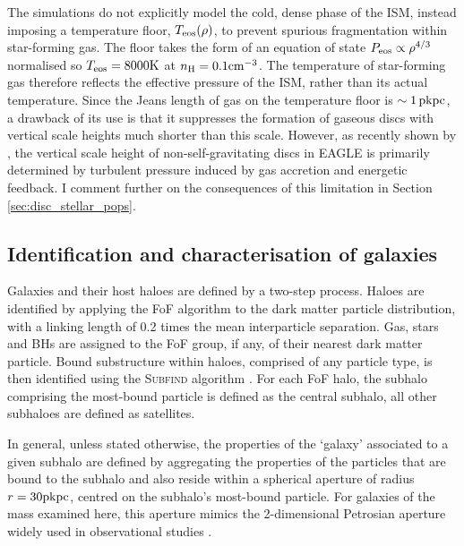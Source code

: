 The simulations do not explicitly model the cold, dense phase of the ISM, instead imposing a temperature floor, $T_{\rm eos}(\rho)$, to prevent spurious fragmentation within star-forming gas. The floor takes the form of an equation of state $P_{\rm eos} \propto \rho^{4/3}$ normalised so $T_{\rm eos} = 8000 {\rm K}$ at $n_{\rm H} = 0.1 {\rm cm}^{-3}$. The temperature of star-forming gas therefore reflects the effective pressure of the ISM, rather than its actual temperature. Since the Jeans length of gas on the temperature floor is $\sim 1\,{\rm pkpc}$, a drawback of its use is that it suppresses the formation of gaseous discs with vertical scale heights much shorter than this scale. However, as recently shown by \citet{2018MNRAS.473.1019B}, the vertical scale height of non-self-gravitating discs in EAGLE is primarily determined by turbulent pressure induced by gas accretion and energetic feedback. I comment further on the consequences of this limitation in Section \ref{sec:disc_stellar_pops}. 

\subsection{Identification and characterisation of galaxies}
\label{sec:finding_galaxies}
Galaxies and their host haloes are defined by a two-step process. Haloes are identified by applying the FoF algorithm to the dark matter particle distribution, with a linking length of 0.2 times the mean interparticle separation. Gas, stars and BHs are assigned to the FoF group, if any, of their nearest dark matter particle. Bound substructure within haloes, comprised of any particle type, is then identified using the \textsc{Subfind} algorithm \citep{2001MNRAS.328..726S,2009MNRAS.399..497D}. For each FoF halo, the subhalo comprising the most-bound particle is defined as the central subhalo, all other subhaloes are defined as satellites.

In general, unless stated otherwise, the properties of the `galaxy' associated to a given subhalo are defined by aggregating the properties of the particles that are bound to the subhalo and also reside within a spherical aperture of radius $r = 30 {\rm pkpc}$, centred on the subhalo's most-bound particle. For galaxies of the mass examined here, this aperture mimics the 2-dimensional Petrosian aperture widely used in observational studies \citep[see][]{2015MNRAS.446..521S}.

